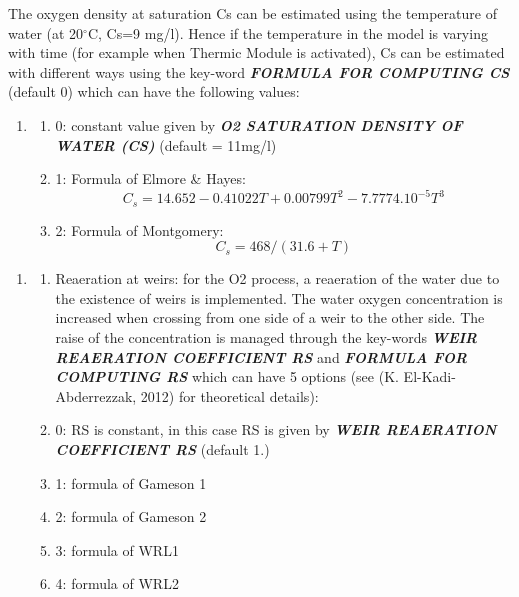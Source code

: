  The oxygen density at saturation Cs can be estimated using the temperature of water (at 20${}^\circ$C, Cs=9 mg/l). Hence if the temperature in the model is varying with time (for example when Thermic Module is activated), Cs can be estimated with different ways using the key-word \textbf{\textit{FORMULA FOR COMPUTING CS}} (default 0) which can have the following values:

\begin{enumerate}
\item \begin{enumerate}
\item  0: constant value given by \textbf{\textit{O2 SATURATION DENSITY OF WATER (CS)}} (default = 11mg/l)

\item  1: Formula of Elmore \& Hayes:
\[C_s=14.652-0.41022T+0.00799T^2-7.7774.{10}^{-5}T^3\]

\item  2: Formula of Montgomery:
\[C_s=468/(31.6+T)\]
\end{enumerate}
\end{enumerate}


\begin{enumerate}
\item \begin{enumerate}
\item  Reaeration at weirs: for the O2 process, a reaeration of the water due to the existence of weirs is implemented. The water oxygen concentration is increased when crossing from one side of a weir to the other side. The raise of the concentration is managed through the key-words \textbf{\textit{WEIR REAERATION COEFFICIENT RS}} and \textbf{\textit{FORMULA FOR COMPUTING RS}} which can have 5 options (see (K. El-Kadi-Abderrezzak, 2012) for theoretical details):

\item  0: RS is constant, in this case RS is given by \textbf{\textit{WEIR REAERATION COEFFICIENT RS }}(default 1.)

\item  1: formula of Gameson 1

\item  2: formula of Gameson 2

\item  3: formula of WRL1

\item  4: formula of WRL2
\end{enumerate}
\end{enumerate}





